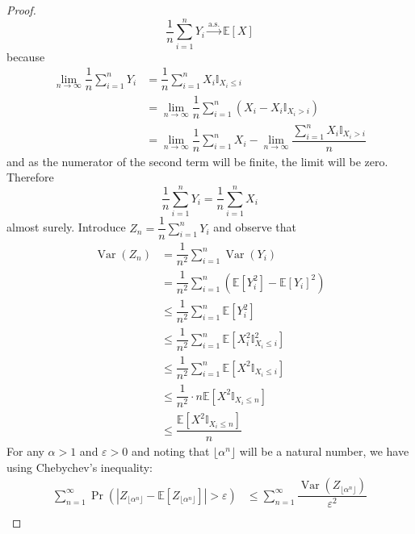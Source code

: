 \documentclass[11pt]{report} %
\begin{document}
\begin{proof}
\begin{equation}
\dfrac{1}{n}\sum_{i = 1}^{n}Y_{i} \overset{\mathrm{a.s.}}{\to} \mathbb{E}\left[X\right]
\end{equation}
because
\begin{align}
\lim_{n\to\infty}\dfrac{1}{n}\sum_{i = 1}^{n}Y_{i} &= \dfrac{1}{n}\sum_{i = 1}^{n}X_{i}\mathbb{I}_{X_{i} \leq i} \\
&= \lim_{n\to\infty}\dfrac{1}{n}\sum_{i = 1}^{n}\left(X_{i} - X_{i}\mathbb{I}_{X_{i} > i}\right) \\
&= \lim_{n\to\infty}\dfrac{1}{n}\sum_{i = 1}^{n}X_{i} - \lim_{n\to\infty}\dfrac{\sum_{i = 1}^{n}X_{i}\mathbb{I}_{X_{i} > i}}{n}
\end{align}
and as the numerator of the second term will be finite, the limit will be zero. Therefore
\begin{equation}
\dfrac{1}{n}\sum_{i = 1}^{n}Y_{i} = \dfrac{1}{n}\sum_{i = 1}^{n}X_{i}
\end{equation}
almost surely. Introduce $Z_{n} = \dfrac{1}{n}\sum_{i = 1}^{n}Y_{i}$ and observe that
\begin{align}
\operatorname{Var}\left(Z_{n}\right) &= \dfrac{1}{n^{2}}\sum_{i = 1}^{n}\operatorname{Var}\left(Y_{i}\right) \\
&= \dfrac{1}{n^{2}}\sum_{i = 1}^{n}\left(\mathbb{E}\left[Y_{i}^{2}\right] - \mathbb{E}\left[Y_{i}\right]^{2}\right) \\
&\leq \dfrac{1}{n^{2}}\sum_{i = 1}^{n}\mathbb{E}\left[Y_{i}^{2}\right] \\
&\leq \dfrac{1}{n^{2}}\sum_{i = 1}^{n}\mathbb{E}\left[X_{i}^{2}\mathbb{I}_{X_{i} \leq i}^{2}\right] \\
&\leq \dfrac{1}{n^{2}}\sum_{i = 1}^{n}\mathbb{E}\left[X^{2}\mathbb{I}_{X_{i} \leq i}\right] \\
&\leq \dfrac{1}{n^{2}}\cdot n\mathbb{E}\left[X^{2}\mathbb{I}_{X_{i} \leq n}\right] \\
&\leq \dfrac{\mathbb{E}\left[X^{2}\mathbb{I}_{X_{i} \leq n}\right]}{n}
\end{align}
For any $\alpha > 1$ and $\varepsilon > 0$ and noting that $\lfloor \alpha^{n} \rfloor$ will be a natural number, we have using Chebychev's inequality:
\begin{align}
\sum_{n = 1}^{\infty}\operatorname{Pr}\left(\left|Z_{\lfloor \alpha^{n} \rfloor} - \mathbb{E}\left[Z_{\lfloor \alpha^{n} \rfloor}\right]\right| > \varepsilon\right) &\leq \sum_{n = 1}^{\infty}\dfrac{\operatorname{Var}\left(Z_{\lfloor \alpha^{n} \rfloor}\right)}{\varepsilon^{2}} \\

\end{align}
\end{proof}
\end{document}
